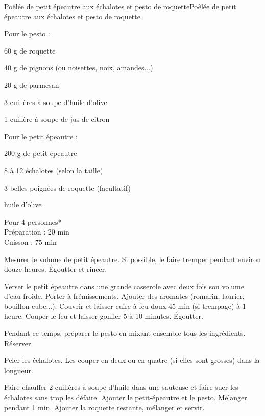 \begin{recette}{Poêlée de petit épeautre aux échalotes et pesto de roquette}{Poêlée de petit épeautre aux échalotes et pesto de roquette}

\begin{ingredients}
Pour le pesto :\par
60 g de roquette\par
40 g de pignons (ou noisettes, noix, amandes...)\par
20 g de parmesan\par
3 cuillères à soupe d'huile d'olive\par
1 cuillère à soupe de jus de citron\par
Pour le petit épeautre :\par
200 g de petit épeautre\par
8 à 12 échalotes (selon la taille)\par
3 belles poignées de roquette (facultatif)\par
huile d'olive\par
\end{ingredients}

\begin{infos}
Pour 4 personnes*	\\
Préparation : 20 min\\
Cuisson : 75 min\\
\end{infos}

\begin{etapes}
\item Mesurer le volume de petit épeautre. Si possible, le faire tremper pendant environ douze heures. Égoutter et rincer.
\item Verser le petit épeautre dans une grande casserole avec deux fois son volume d'eau froide. Porter à frémissements. Ajouter des aromates (romarin, laurier, bouillon cube...). Couvrir et laisser cuire à feu doux 45 min (si trempage) à 1 heure. Couper le feu et laisser gonfler 5 à 10 minutes. Égoutter.
\item Pendant ce temps, préparer le pesto en mixant ensemble tous les ingrédients. Réserver.
\item Peler les échalotes. Les couper en deux ou en quatre (si elles sont grosses) dans la longueur.
\item Faire chauffer 2 cuillères à soupe d’huile dans une sauteuse et faire suer les échalotes sans trop les défaire. Ajouter le petit-épeautre et le pesto. Mélanger pendant 1 min. Ajouter la roquette restante, mélanger et servir.
\end{etapes}

\end{recette}